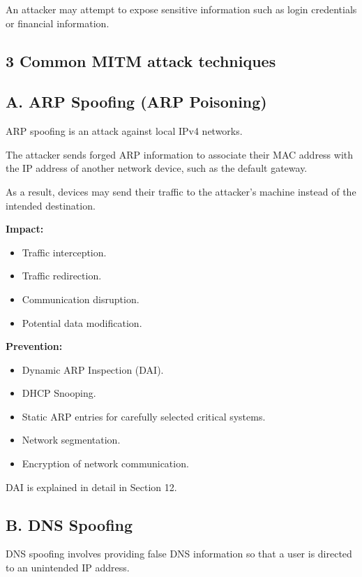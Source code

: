 An attacker may attempt to expose sensitive information such as login credentials or financial information.

\subsection{3 Common MITM attack techniques}

\subsection{A. ARP Spoofing (ARP Poisoning)}

ARP spoofing is an attack against local IPv4 networks.

The attacker sends forged ARP information to associate their MAC address with the IP address of another network device, such as the default gateway.

As a result, devices may send their traffic to the attacker's machine instead of the intended destination.

\textbf{Impact:}

\begin{itemize}
\item Traffic interception.
\item Traffic redirection.
\item Communication disruption.
\item Potential data modification.
\end{itemize}

\textbf{Prevention:}

\begin{itemize}
\item Dynamic ARP Inspection (DAI).
\item DHCP Snooping.
\item Static ARP entries for carefully selected critical systems.
\item Network segmentation.
\item Encryption of network communication.
\end{itemize}

DAI is explained in detail in Section 12.

\subsection{B. DNS Spoofing}

DNS spoofing involves providing false DNS information so that a user is directed to an unintended IP address.

